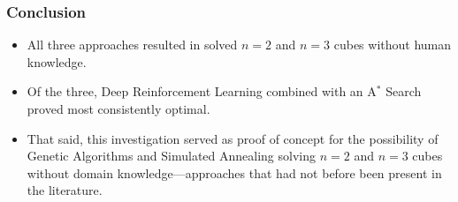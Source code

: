 \documentclass[UKenglish]{beamer}
\begin{document}
\begin{frame}
\frametitle{Conclusion}
\begin{itemize}
    \item All three approaches resulted in solved $n=2$ and $n=3$ cubes without human knowledge.
    \item Of the three, Deep Reinforcement Learning combined with an A$^\ast$ Search proved most consistently optimal.
    \item That said, this investigation served as proof of concept for the possibility of Genetic Algorithms and Simulated Annealing solving $n=2$ and $n=3$ cubes without domain knowledge---approaches that had not before been present in the literature.
\end{itemize}

\end{frame}
\end{document}
